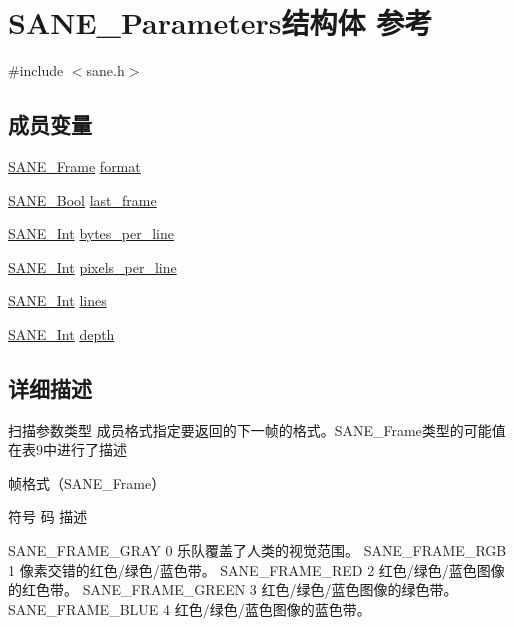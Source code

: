 \hypertarget{structSANE__Parameters}{}\section{S\+A\+N\+E\+\_\+\+Parameters结构体 参考}
\label{structSANE__Parameters}


{\ttfamily \#include $<$sane.\+h$>$}

\subsection*{成员变量}
\begin{DoxyCompactItemize}
\item 
\hyperlink{sane_8h_ac5182b25bf83c5e16c4e6e8d998eecac}{S\+A\+N\+E\+\_\+\+Frame} \hyperlink{structSANE__Parameters_a86bae88d477d1803ea37af900e029334}{format}
\item 
\hyperlink{sane_8h_afb77ef4d4ce97f57e5a9e54393f979ee}{S\+A\+N\+E\+\_\+\+Bool} \hyperlink{structSANE__Parameters_afca30ddfdced766e29e3ac328f14f737}{last\+\_\+frame}
\item 
\hyperlink{sane_8h_a18b0de32eae6997909ae9ab0117af3d5}{S\+A\+N\+E\+\_\+\+Int} \hyperlink{structSANE__Parameters_aca06c63a777ef5a377fd59455c2e6dcf}{bytes\+\_\+per\+\_\+line}
\item 
\hyperlink{sane_8h_a18b0de32eae6997909ae9ab0117af3d5}{S\+A\+N\+E\+\_\+\+Int} \hyperlink{structSANE__Parameters_a4205f462c4fa84fbf31cc4848ba9046c}{pixels\+\_\+per\+\_\+line}
\item 
\hyperlink{sane_8h_a18b0de32eae6997909ae9ab0117af3d5}{S\+A\+N\+E\+\_\+\+Int} \hyperlink{structSANE__Parameters_acca4d0df97ee91fd081dfff7e7908143}{lines}
\item 
\hyperlink{sane_8h_a18b0de32eae6997909ae9ab0117af3d5}{S\+A\+N\+E\+\_\+\+Int} \hyperlink{structSANE__Parameters_a96226ce43f21e11bffb86e7ddb170d65}{depth}
\end{DoxyCompactItemize}


\subsection{详细描述}
扫描参数类型 成员格式指定要返回的下一帧的格式。\+S\+A\+N\+E\+\_\+\+Frame类型的可能值在表9中进行了描述

帧格式（\+S\+A\+N\+E\+\_\+\+Frame）

符号 码 描述

S\+A\+N\+E\+\_\+\+F\+R\+A\+M\+E\+\_\+\+G\+R\+AY 0 乐队覆盖了人类的视觉范围。 S\+A\+N\+E\+\_\+\+F\+R\+A\+M\+E\+\_\+\+R\+GB 1 像素交错的红色/绿色/蓝色带。 S\+A\+N\+E\+\_\+\+F\+R\+A\+M\+E\+\_\+\+R\+ED 2 红色/绿色/蓝色图像的红色带。 S\+A\+N\+E\+\_\+\+F\+R\+A\+M\+E\+\_\+\+G\+R\+E\+EN 3 红色/绿色/蓝色图像的绿色带。 S\+A\+N\+E\+\_\+\+F\+R\+A\+M\+E\+\_\+\+B\+L\+UE 4 红色/绿色/蓝色图像的蓝色带。

